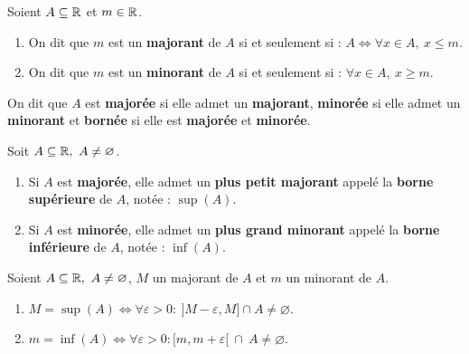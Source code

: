 \begin{definition}
    Soient $A \subseteq \mathbb{R}$ et $m \in \mathbb{R}$.
    \begin{enumerate}
        \item On dit que $m$ est un \textbf{majorant} de $A$ si et seulement si : $A \iff \forall x \in A,\ x \leq m$.
        \item On dit que $m$ est un \textbf{minorant} de $A$ si et seulement si : $\forall x \in A,\ x \geq m$.
    \end{enumerate}
    On dit que $A$ est \textbf{majorée} si elle admet un \textbf{majorant}, \textbf{minorée} si elle admet un \textbf{minorant} et \textbf{bornée} si elle est \textbf{majorée} et \textbf{minorée}.
\end{definition}

\begin{theorem}
    Soit $A \subseteq \mathbb{R},\ A \neq \varnothing$. 
    \begin{enumerate}
    	\item Si $A$ est \textbf{majorée}, elle admet un \textbf{plus petit majorant} appelé la \textbf{borne supérieure} de $A$, notée : $\sup(A)$.
    	\item Si $A$ est \textbf{minorée}, elle admet un \textbf{plus grand minorant} appelé la \textbf{borne inférieure} de $A$, notée : $\inf(A)$.
    \end{enumerate}
\end{theorem}

\begin{proposition}
    Soient $A \subseteq \mathbb{R},\ A \neq \varnothing$, $M$ un majorant de $A$ et $m$ un minorant de $A$.  
    \begin{enumerate}
        \item $M = \sup(A) \iff \forall \varepsilon > 0 : \ ]M - \varepsilon, M] \cap A \neq \varnothing$.
        \item $m = \inf(A) \iff \forall \varepsilon > 0 : [m, m + \varepsilon[ \ \cap \ A \neq \varnothing $.
    \end{enumerate}
\end{proposition}